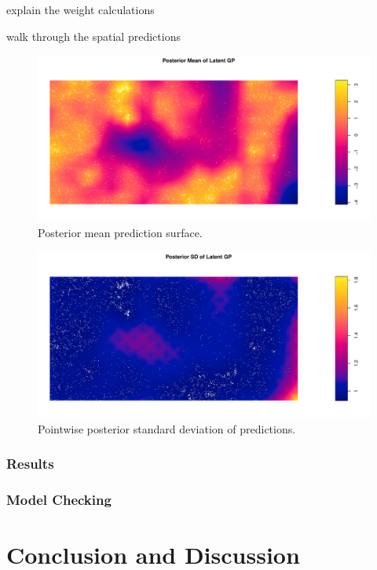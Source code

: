 \documentclass[]{interact}
\begin{document}
explain the weight calculations

walk through the spatial predictions

\begin{figure}[h]
\includegraphics[width=\textwidth]{figures/beimean.pdf}
\caption{Posterior mean prediction surface.}
\label{beimean}
\end{figure}

\begin{figure}[h]
\includegraphics[width=\textwidth]{figures/beisd.pdf}
\caption{Pointwise posterior standard deviation of predictions.}
\label{beisd}
\end{figure}


\subsubsection{Results}


\subsubsection{Model Checking}


\section{Conclusion and Discussion}
\end{document}
